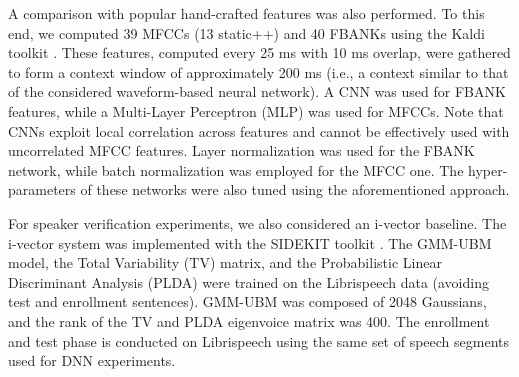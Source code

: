 \documentclass{article}
\begin{document}
A comparison with popular hand-crafted features was also performed. To this end, we computed 39 MFCCs (13 static++) and 40 FBANKs using the Kaldi toolkit \cite{kaldi_short}. These features,  computed every 25 ms with 10 ms overlap, were gathered to form a context window of approximately 200 ms (i.e., a context similar to that of the considered waveform-based neural network). A CNN was used for FBANK features, while a Multi-Layer Perceptron (MLP) was used for MFCCs. Note that CNNs exploit local correlation across features and cannot be effectively used with uncorrelated MFCC features. Layer normalization was used for the FBANK network, while batch normalization was employed for the MFCC one. The hyper-parameters of these networks were also tuned using the aforementioned approach. 

For speaker verification experiments, we also considered an i-vector baseline. The i-vector system was implemented with the SIDEKIT toolkit \cite{sidekit}. The GMM-UBM model, the Total Variability (TV) matrix, and the Probabilistic Linear Discriminant Analysis (PLDA) were trained on the Librispeech data (avoiding test and enrollment sentences). GMM-UBM was composed of 2048 Gaussians, and the rank of the TV and PLDA eigenvoice matrix was 400. The enrollment and test phase is conducted on Librispeech using the same set of speech segments used for DNN experiments.
\end{document}
